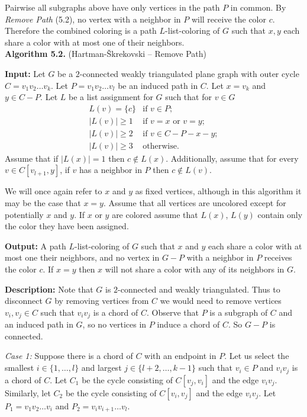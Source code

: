 \documentclass[letterpaper, 12pt]{article}
\theoremstyle{thm}
\begin{document}
Pairwise all subgraphs above have only vertices in the path $P$ in common.
By \textit{Remove Path} (5.2), no vertex with a neighbor in $P$ will
receive the color $c$. Therefore the combined coloring is a path
$L$-list-coloring of $G$ such that $x,y$ each share a color with at most one of
their neighbors.\\

\noindent\textbf{Algorithm 5.2.} (Hartman-\v{S}krekovski -- Remove Path)

\noindent\textbf{Input:} Let $G$ be a $2$-connected weakly triangulated plane
graph with outer cycle $C=v_1v_2\ldots v_k$. Let $P=v_1v_2\ldots v_l$ be an
induced path in $C$. Let $x=v_k$ and $y\in C-P$. Let $L$ be a list
assignment for $G$ such that for $v\in G$
\[
    \begin{array}{ll}
        L(v)=\{c\} & \text{if } v\in P;\\
	    \big|L(v)\big|\ge 1 & \text{if } v=x \text{ or } v=y;\\
	    \big|L(v)\big|\ge 2 & \text{if } v\in C-P-x-y;\\
	    \big|L(v)\big|\ge 3 & \text{otherwise.}
    \end{array}
\]
Assume that if $\big|L(x)\big|=1$ then $c\not\in L(x)$. Additionally, assume that for every
$v\in C[v_{l+1},y]$, if $v$ has a neighbor in $P$ then $c\not\in L(v)$.

We will once again refer to $x$ and $y$ as fixed vertices, although in this
algorithm it may be the case that $x=y$. Assume that all
vertices are uncolored except for potentially $x$ and $y$. If $x$ or $y$ are
colored assume that $L(x)$, $L(y)$ contain only the color they have been assigned.

\noindent\textbf{Output:} A path $L$-list-coloring of $G$ such that $x$ and
$y$ each share a color with at most one their neighbors, and no vertex in
$G-P$ with a neighbor in $P$ receives the color $c$. If $x=y$ then $x$ will
not share a color with any of its neighbors in $G$.

\noindent\textbf{Description:}
Note that $G$ is $2$-connected and weakly triangulated. Thus to disconnect $G$ by
removing vertices from $C$ we would need to remove vertices
$v_i,v_j\in C$ such that $v_iv_j$ is a chord of $C$.
Observe that $P$ is a subgraph of $C$ and an induced path in $G$, so no vertices in
$P$ induce a chord of $C$. So $G-P$ is connected.

\textit{Case 1:} Suppose there is a chord of $C$ with an endpoint in $P$. Let us
select the smallest $i\in\{1,\ldots,l\}$ and largest $j\in\{l+2,\ldots,k-1\}$
such that $v_i\in P$ and $v_iv_j$ is a chord of $C$. Let $C_1$ be the cycle
consisting of $C[v_j,v_i]$ and the edge $v_iv_j$. Similarly, let $C_2$ be the
cycle consisting of $C[v_i,v_j]$ and the edge $v_iv_j$. Let
$P_1=v_1v_2\ldots v_i$ and $P_2=v_iv_{i+1}\ldots v_l$.
\end{document}

